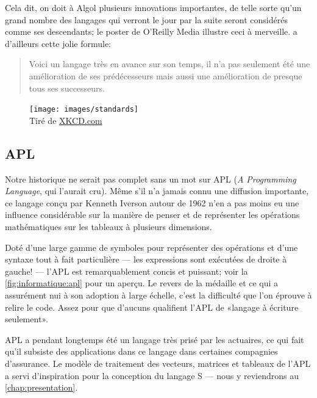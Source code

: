 Cela dit, on doit à Algol plusieurs innovations importantes, de telle
sorte qu'un grand nombre des langages qui verront le jour par la suite
seront considérés comme ses descendants; le poster
 de O'Reilly Media illustre ceci à
merveille. \citet{Hoare:1973} a d'ailleurs cette jolie formule:
\begin{quote}
  Voici un langage très en avance sur son temps, il n'a pas seulement
  été une amélioration de ses prédécesseurs mais aussi une
  amélioration de presque tous ses successeurs.
\end{quote}

\begin{figure}[t]
  \centering
  \begin{minipage}{0.9\linewidth}
    \texttt{[image: images/standards]} \\
    \footnotesize\sffamily%
    Tiré de \href{https://xkcd.com/927/}{XKCD.com}
  \end{minipage}
\end{figure}

\subsection{APL}
\label{sec:informatique:historique:apl}

Notre historique ne serait pas complet sans un mot sur APL
(\emph{A Programming Language}, qui l'aurait cru). Même s'il n'a
jamais connu une diffusion importante, ce langage conçu par Kenneth
Iverson autour de 1962 n'en a pas moins eu une influence considérable
sur la manière de penser et de représenter les opérations
mathématiques sur les tableaux à plusieurs dimensions.

Doté d'une large gamme de symboles pour représenter des opérations et
d'une syntaxe tout à fait particulière --- les expressions sont
exécutées de droite à gauche! --- l'APL est remarquablement concis et
puissant; voir la \autoref{fig:informatique:apl} pour un aperçu. Le
revers de la médaille et ce qui a assurément nui à son adoption
à large échelle, c'est la difficulté que l'on éprouve à relire le
code. Assez pour que d'aucuns qualifient l'APL de «langage à écriture
seulement».

APL a pendant longtemps été un langage très prisé par les actuaires,
ce qui fait qu'il subsiste des applications dans ce langage dans
certaines compagnies d'assurance. Le modèle de traitement des
vecteurs, matrices et tableaux de l'APL a servi d'inspiration pour la
conception du langage S --- nous y reviendrons au
\autoref{chap:presentation}.

